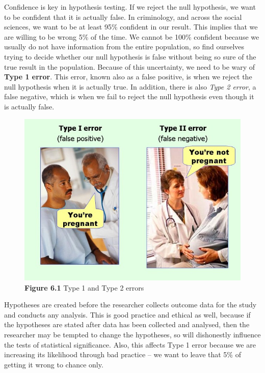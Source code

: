 \documentclass[
]{book}
\begin{document}
Confidence is key in hypothesis testing. If we reject the null hypothesis, we want to be confident that it is actually false. In criminology, and across the social sciences, we want to be at least 95\% confident in our result. This implies that we are willing to be wrong 5\% of the time. We cannot be 100\% confident because we usually do not have information from the entire population, so find ourselves trying to decide whether our null hypothesis is false without being so sure of the true result in the population. Because of this uncertainty, we need to be wary of \textbf{Type 1 error}. This error, known also as a false positive, is when we reject the null hypothesis when it is actually true. In addition, there is also \emph{Type 2 error}, a false negative, which is when we fail to reject the null hypothesis even though it is actually false.

\begin{figure}
\centering
\includegraphics{Images/errors.jpg}
\caption{\textbf{Figure 6.1} Type 1 and Type 2 errors}
\end{figure}

Hypotheses are created before the researcher collects outcome data for the study and conducts any analysis. This is good practice and ethical as well, because if the hypotheses are stated after data has been collected and analysed, then the researcher may be tempted to change the hypotheses, so will dishonestly influence the tests of statistical significance. Also, this affects Type 1 error because we are increasing its likelihood through bad practice -- we want to leave that 5\% of getting it wrong to chance only.
\end{document}
